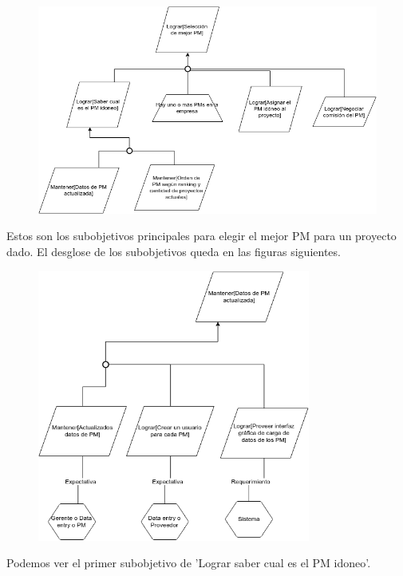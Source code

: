 \begin{figure}[H]
    \centering
    \includegraphics[width=\textwidth]{imagenes/objetivos-seleccion-mejor-pm-principal.png}
\end{figure}

Estos son los subobjetivos principales para elegir el mejor PM para un proyecto dado. El desglose de los subobjetivos queda en las figuras siguientes.

\begin{figure}[H]
    \centering
    \includegraphics[width=0.8\textwidth]{imagenes/objetivos-seleccion-mejor-pm-1-1.png}
\end{figure}

Podemos ver el primer subobjetivo de 'Lograr saber cual es el PM idoneo'.

